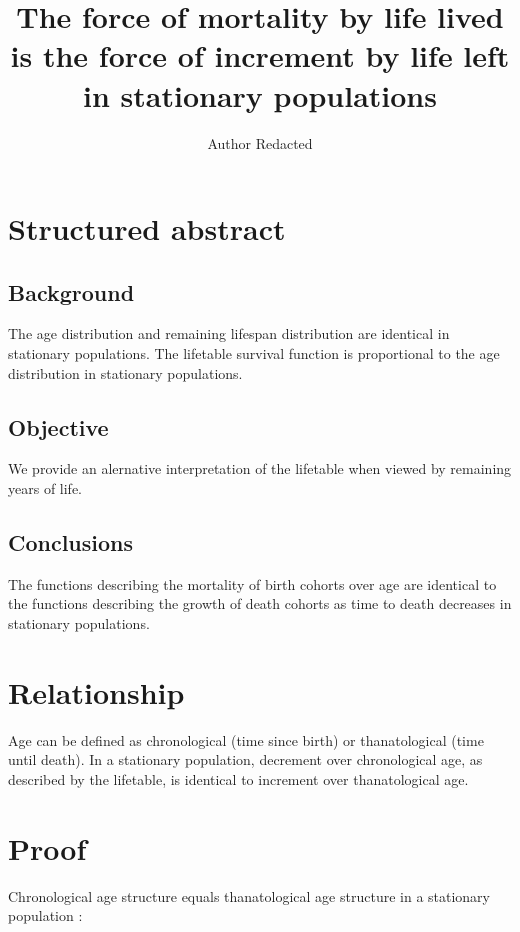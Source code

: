 \documentclass{article}
\begin{document}
\title{The force of mortality by life lived is the force of increment by life
left in stationary populations}
\author{Author Redacted}
\maketitle
\section*{Structured abstract}

\subsection*{Background}
The age distribution and remaining lifespan distribution are identical in
stationary populations. The lifetable survival function is proportional to the
age distribution in stationary populations.

\subsection*{Objective}
We provide an alernative interpretation of the lifetable when viewed by
remaining years of life.

\subsection*{Conclusions}
The functions describing the mortality of birth cohorts over age are identical
to the functions describing the growth of death cohorts as time to death decreases in stationary populations.
\vspace{2cm}
\section*{Relationship}

Age can be defined as chronological (time since birth) or thanatological (time
until death). In a stationary population, decrement over
chronological age, as described by the lifetable, is
identical to increment over thanatological age.

\section*{Proof}

Chronological age structure equals thanatological age structure in a stationary
population \citep{brouard1989mouvements,vaupel2009life}:
\end{document}

